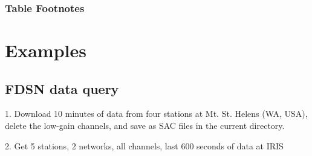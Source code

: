 \documentclass[letterpaper,11pt,english]{sphinxmanual}
\begin{document}
\subsubsection*{Table Footnotes}


\section{Examples}
\label{\detokenize{src/Appendices/examples:examples}}\label{\detokenize{src/Appendices/examples:webex}}\label{\detokenize{src/Appendices/examples::doc}}

\subsection{FDSN data query}
\label{\detokenize{src/Appendices/examples:fdsn-data-query}}
1. Download 10 minutes of data from four stations at Mt. St. Helens (WA, USA), delete the low-gain channels, and save as SAC files in the current directory.

%
\begin{sphinxVerbatim}[commandchars=\\\{\}]
     
  
  
\end{sphinxVerbatim}

2. Get 5 stations, 2 networks, all channels, last 600 seconds of data at IRIS

%
\begin{sphinxVerbatim}[commandchars=\\\{\}]
  
  
  
      
\end{sphinxVerbatim}
\end{document}
